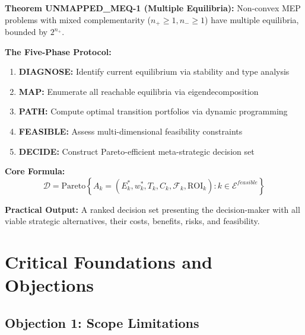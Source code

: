 \begin{tcolorbox}[colback=blue!5!white, colframe=blue!75!black,
    title=Key Results: Multiple Equilibria \& Strategic Navigation]

\textbf{Theorem UNMAPPED_MEQ-1 (Multiple Equilibria):}
Non-convex MEP problems with mixed complementarity ($n_+ \geq 1, n_- \geq 1$)
have multiple equilibria, bounded by $2^{n_+}$.

\textbf{The Five-Phase Protocol:}
\begin{enumerate}
    \item \textbf{DIAGNOSE:} Identify current equilibrium via stability and type analysis
    \item \textbf{MAP:} Enumerate all reachable equilibria via eigendecomposition
    \item \textbf{PATH:} Compute optimal transition portfolios via dynamic programming
    \item \textbf{FEASIBLE:} Assess multi-dimensional feasibility constraints
    \item \textbf{DECIDE:} Construct Pareto-efficient meta-strategic decision set
\end{enumerate}

\textbf{Core Formula:}
\begin{equation}
\mathcal{D} = \text{Pareto}\left\{ A_k = (E^*_k, w^*_k, T_k, C_k, \mathcal{F}_k, \text{ROI}_k) : k \in \mathcal{E}^{feasible} \right\}
\end{equation}

\textbf{Practical Output:} A ranked decision set presenting the decision-maker
with all viable strategic alternatives, their costs, benefits, risks, and feasibility.

\end{tcolorbox}


\section{Critical Foundations and Objections}
\label{sec:meq-foundations}

\subsection{Objection 1: Scope Limitations}

